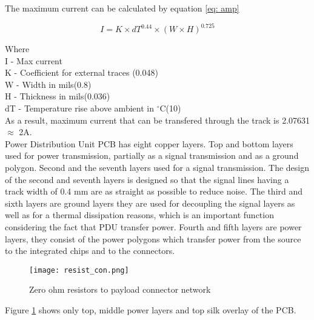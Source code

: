The maximum current can be calculated by equation \ref{eq: amp}

\begin{equation}\label{eq: amp}
I = K \times dT^{0.44} \times (W \times H)^{0.725}
\end{equation}

Where\\

I - Max current\\
K - Coefficient for external traces (0.048)\\
W - Width in mils(0.8)\\
H - Thickness in mils(0.036) \\
dT - Temperature rise above ambient in $^\circ$C(10)\\

As a result, maximum current that can be transfered through the track is 2.07631 $\approx$ 2A.\\ 

Power Distribution Unit PCB has eight copper layers. Top and bottom layers used for power transmission, partially as a signal transmission and as a ground polygon. Second and the seventh layers used for a signal transmission. The design of the second and seventh layers is designed so that the signal lines having a track width of 0.4 mm are as straight as possible to reduce noise. The third and sixth layers are ground layers they are used for decoupling the signal layers as well as for a thermal dissipation reasons, which is an important function considering the fact that PDU  transfer power. Fourth and fifth layers are power layers, they consist of the power polygons which transfer power from the source to the integrated chips and to the connectors.   

\begin{figure}[h]
	\centering
	\texttt{[image: resist\_con.png]}
	\caption{Zero ohm resistors to payload connector network}
	\label{fig: res}
\end{figure} 


Figure \ref{fig: res} shows only top, middle power layers and top silk overlay of the PCB.

